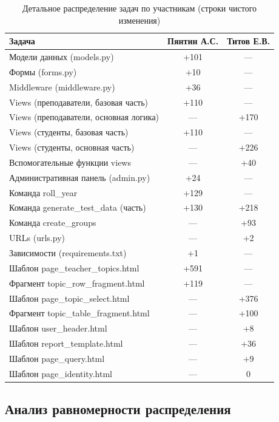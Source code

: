\documentclass[a4paper,12pt]{article}
\begin{document}
\begin{table}[H]
\centering
\caption{Детальное распределение задач по участникам (строки чистого изменения)}
\begin{tabular}{|l|c|c|}
\hline
\textbf{Задача} & \textbf{Пянтин А.С.} & \textbf{Титов Е.В.} \\
\hline
Модели данных (models.py) & +101 & --- \\
\hline
Формы (forms.py) & +10 & --- \\
\hline
Middleware (middleware.py) & +36 & --- \\
\hline
Views (преподаватели, базовая часть) & +110 & --- \\
\hline
Views (преподаватели, основная логика) & --- & +170 \\
\hline
Views (студенты, базовая часть) & +110 & --- \\
\hline
Views (студенты, основная часть) & --- & +226 \\
\hline
Вспомогательные функции views & --- & +40 \\
\hline
Административная панель (admin.py) & +24 & --- \\
\hline
Команда roll\_year & +129 & --- \\
\hline
Команда generate\_test\_data (часть) & +130 & +218 \\
\hline
Команда create\_groups & --- & +93 \\
\hline
URLs (urls.py) & --- & +2 \\
\hline
Зависимости (requirements.txt) & +1 & --- \\
\hline
Шаблон page\_teacher\_topics.html & +591 & --- \\
\hline
Фрагмент topic\_row\_fragment.html & +119 & --- \\
\hline
Шаблон page\_topic\_select.html & --- & +376 \\
\hline
Фрагмент topic\_table\_fragment.html & --- & +100 \\
\hline
Шаблон user\_header.html & --- & +8 \\
\hline
Шаблон report\_template.html & --- & +36 \\
\hline
Шаблон page\_query.html & --- & +9 \\
\hline
Шаблон page\_identity.html & --- & 0 \\
\hline
\end{tabular}
\label{tab:detailed_distribution}
\end{table}

\subsection{Анализ равномерности распределения}
\end{document}
